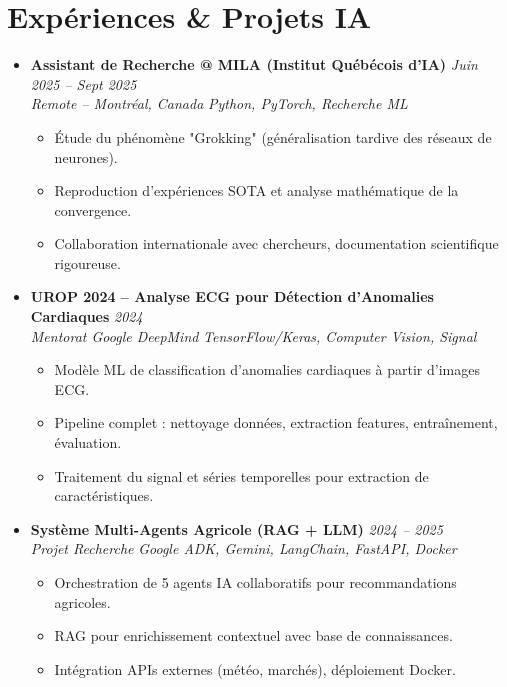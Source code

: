 \documentclass[a4paper,11pt]{article}
\begin{document}
\section{Expériences \& Projets IA}
\begin{itemize}[leftmargin=*, label={-}]

\item \textbf{Assistant de Recherche @ MILA (Institut Québécois d'IA)} \hfill \textit{Juin 2025 -- Sept 2025} \\
\textit{Remote -- Montréal, Canada} \hfill \textit{Python, PyTorch, Recherche ML}
\vspace{-2pt}
    \begin{itemize}[leftmargin=0.4cm, nosep, label=\tiny$\bullet$]
        \item \small{Étude du phénomène "Grokking" (généralisation tardive des réseaux de neurones).}
        \item \small{Reproduction d'expériences SOTA et analyse mathématique de la convergence.}
        \item \small{Collaboration internationale avec chercheurs, documentation scientifique rigoureuse.}
    \end{itemize}
\vspace{3pt}

\item \textbf{UROP 2024 -- Analyse ECG pour Détection d'Anomalies Cardiaques} \hfill \textit{2024} \\
\textit{Mentorat Google DeepMind} \hfill \textit{TensorFlow/Keras, Computer Vision, Signal}
\vspace{-2pt}
    \begin{itemize}[leftmargin=0.4cm, nosep, label=\tiny$\bullet$]
        \item \small{Modèle ML de classification d'anomalies cardiaques à partir d'images ECG.}
        \item \small{Pipeline complet : nettoyage données, extraction features, entraînement, évaluation.}
        \item \small{Traitement du signal et séries temporelles pour extraction de caractéristiques.}
    \end{itemize}
\vspace{3pt}

\item \textbf{Système Multi-Agents Agricole (RAG + LLM)} \hfill \textit{2024 -- 2025} \\
\textit{Projet Recherche} \hfill \textit{Google ADK, Gemini, LangChain, FastAPI, Docker}
\vspace{-2pt}
    \begin{itemize}[leftmargin=0.4cm, nosep, label=\tiny$\bullet$]
        \item \small{Orchestration de 5 agents IA collaboratifs pour recommandations agricoles.}
        \item \small{RAG pour enrichissement contextuel avec base de connaissances.}
        \item \small{Intégration APIs externes (météo, marchés), déploiement Docker.}
    \end{itemize}
\vspace{3pt}


\end{itemize}
\end{document}
